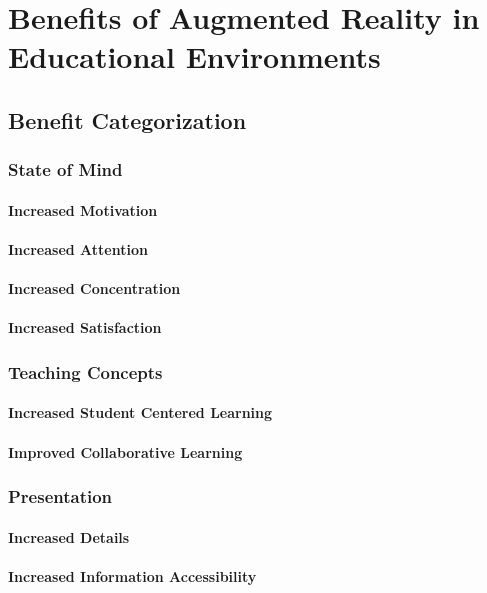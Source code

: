 \section{Benefits of Augmented Reality in Educational Environments}
\subsection{Benefit Categorization}
\label{subsec:Benefits}
\subsubsection{State of Mind}
\paragraph*{Increased Motivation}
\paragraph*{Increased Attention}
\paragraph*{Increased Concentration}
\paragraph*{Increased Satisfaction}
\subsubsection{Teaching Concepts}
\paragraph*{Increased Student Centered Learning}
\paragraph*{Improved Collaborative Learning}
\subsubsection{Presentation}
\paragraph*{Increased Details}
\paragraph*{Increased Information Accessibility}
